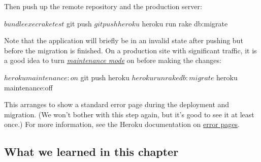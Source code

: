 
\noindent Then push up the remote repository and the production server:

\begin{code}
$ bundle exec rake test
$ git push
$ git push heroku
$ heroku run rake db:migrate
\end{code}

\noindent Note that the application will briefly be in an invalid state after pushing but before the migration is finished. On a production site with significant traffic, it is a good idea to turn \href{https://devcenter.heroku.com/articles/maintenance-mode}{\emph{maintenance mode}} on before making the changes:

\begin{code}
$ heroku maintenance:on
$ git push heroku
$ heroku run rake db:migrate
$ heroku maintenance:off
\end{code}

\noindent This arranges to show a standard error page during the deployment and migration. (We won't bother with this step again, but it's good to see it at least once.) For more information, see the Heroku documentation on \href{https://devcenter.heroku.com/articles/error-pages}{error pages}.

\subsection{What we learned in this chapter} %
\label{sec:log_in_out_what_we_learned_in_this_chapter}


